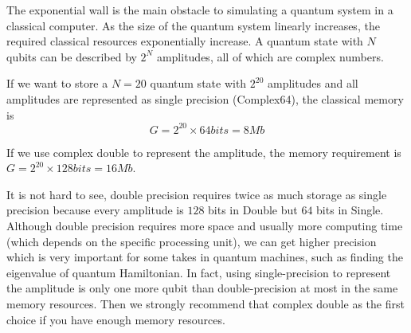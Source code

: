 The exponential wall is the main obstacle to simulating a quantum system in a classical computer.
As the size of the quantum system linearly increases, the required classical resources exponentially increase.
A quantum state with $N$ qubits can be described by $2^N$ amplitudes, all of which are complex numbers.

If we want to store a $N=20$ quantum state with $2^20$ amplitudes and all amplitudes are represented as single precision (Complex64), the classical memory is 
\begin{equation}
    G=2^{20}\times 64 bits = 8 Mb
\end{equation}

If we use complex double to represent the amplitude, the memory requirement is $G=2^{20}\times 128 bits=16 Mb$.

It is not hard to see, double precision requires twice as much storage as single precision because every amplitude is $128$ bits in Double but $64$ bits in Single.
Although double precision requires more space and usually more computing time (which depends on the specific processing unit), we can get higher precision which is very important for some takes in quantum machines, such as finding the eigenvalue of quantum Hamiltonian.
In fact, using single-precision to represent the amplitude is only one more qubit than double-precision at most in the same memory resources.
Then we strongly recommend that complex double as the first choice if you have enough memory resources. 